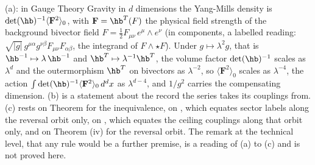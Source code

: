 (a): in Gauge Theory Gravity in $d$ dimensions the Yang-Mills density is $\det(\hb)^{-1}\langle\mathbf{F}^{2}\rangle_{0}$, with $\mathbf{F} = \hb^{T}(F)$ the physical field strength of the background bivector field $F = \tfrac12 F_{\mu\nu}\,e^{\mu}\wedge e^{\nu}$ (in components, a labelled reading: $\sqrt{|g|}\,g^{\mu\alpha}g^{\nu\beta}F_{\mu\nu}F_{\alpha\beta}$, the integrand of $F \wedge \star F$). Under $g \mapsto \lambda^{2}g$, that is $\hb^{-1} \mapsto \lambda\,\hb^{-1}$ and $\hb^{T} \mapsto \lambda^{-1}\hb^{T}$, the volume factor $\det(\hb)^{-1}$ scales as $\lambda^{d}$ and the outermorphism $\hb^{T}$ on bivectors as $\lambda^{-2}$, so $\langle\mathbf{F}^{2}\rangle_{0}$ scales as $\lambda^{-4}$, the action $\int\det(\hb)^{-1}\langle\mathbf{F}^{2}\rangle_{0}\,d^{d}x$ as $\lambda^{d-4}$, and $1/g^{2}$ carries the compensating dimension. (b) is a statement about the record the series takes its couplings from. (c) rests on Theorem  for the inequivalence, on , which equates sector labels along the reversal orbit only, on , which equates the ceiling couplings along that orbit only, and on Theorem (iv) for the reversal orbit. The remark at the technical level, that any rule would be a further premise, is a reading of (a) to (c) and is not proved here.

